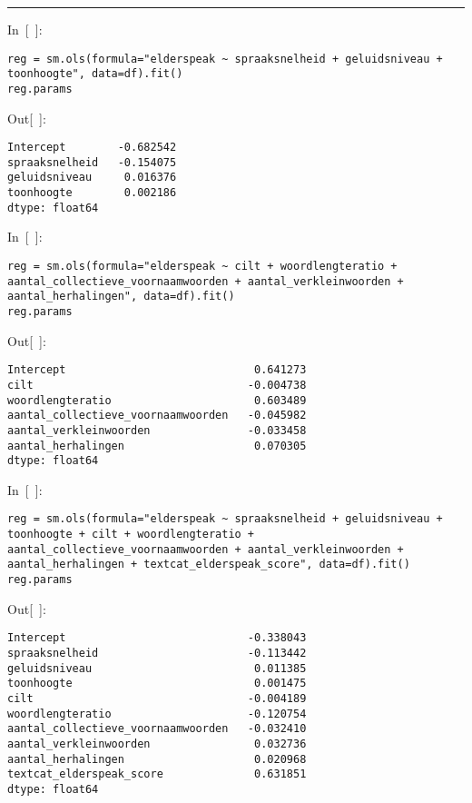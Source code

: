 \documentclass[
]{article}
\begin{document}
\begin{center}\rule{0.5\linewidth}{0.5pt}\end{center}

In~{[}~{]}:

\begin{verbatim}
reg = sm.ols(formula="elderspeak ~ spraaksnelheid + geluidsniveau + toonhoogte", data=df).fit()
reg.params
\end{verbatim}

Out{[}~{]}:

\begin{verbatim}
Intercept        -0.682542
spraaksnelheid   -0.154075
geluidsniveau     0.016376
toonhoogte        0.002186
dtype: float64
\end{verbatim}

In~{[}~{]}:

\begin{verbatim}
reg = sm.ols(formula="elderspeak ~ cilt + woordlengteratio + aantal_collectieve_voornaamwoorden + aantal_verkleinwoorden + aantal_herhalingen", data=df).fit()
reg.params
\end{verbatim}

Out{[}~{]}:

\begin{verbatim}
Intercept                             0.641273
cilt                                 -0.004738
woordlengteratio                      0.603489
aantal_collectieve_voornaamwoorden   -0.045982
aantal_verkleinwoorden               -0.033458
aantal_herhalingen                    0.070305
dtype: float64
\end{verbatim}

In~{[}~{]}:

\begin{verbatim}
reg = sm.ols(formula="elderspeak ~ spraaksnelheid + geluidsniveau + toonhoogte + cilt + woordlengteratio + aantal_collectieve_voornaamwoorden + aantal_verkleinwoorden + aantal_herhalingen + textcat_elderspeak_score", data=df).fit()
reg.params
\end{verbatim}

Out{[}~{]}:

\begin{verbatim}
Intercept                            -0.338043
spraaksnelheid                       -0.113442
geluidsniveau                         0.011385
toonhoogte                            0.001475
cilt                                 -0.004189
woordlengteratio                     -0.120754
aantal_collectieve_voornaamwoorden   -0.032410
aantal_verkleinwoorden                0.032736
aantal_herhalingen                    0.020968
textcat_elderspeak_score              0.631851
dtype: float64
\end{verbatim}
\end{document}
